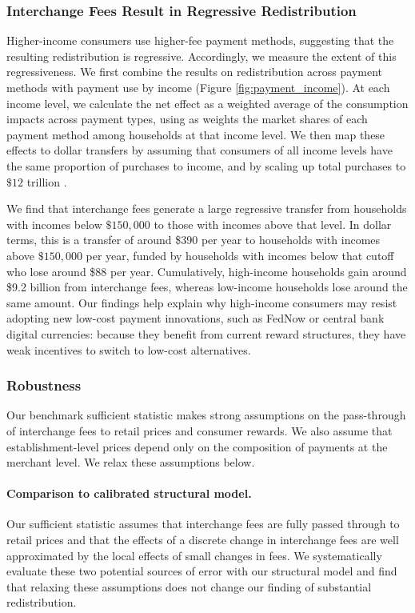 \documentclass[11pt,english]{article}
\theoremstyle{remark}
\begin{document}
\subsubsection{Interchange Fees Result in Regressive Redistribution}

Higher-income consumers use higher-fee payment methods, suggesting that the resulting redistribution is regressive.
Accordingly, we measure the extent of this regressiveness.
We first combine the results on redistribution across payment methods with payment use by income (Figure \ref{fig:payment_income}).
At each income level, we calculate the net effect as a weighted average of the consumption impacts across payment types, using as weights the market shares of each payment method among households at that income level.
We then map these effects to dollar transfers by assuming that consumers of all income levels have the same proportion of purchases to income, and by scaling up total purchases to $\$12$ trillion \citep{Nilson2023a}.

We find that interchange fees generate a large regressive transfer from households with incomes below $\$150,000$ to those with incomes above that level.
In dollar terms, this is a transfer of around \$390 per year to households with incomes above $\$150,000$ per year, funded by households with incomes below that cutoff who lose around \$88 per year.
Cumulatively, high-income households gain around \$9.2 billion from interchange fees, whereas low-income households lose around the same amount.
Our findings help explain why high-income consumers may resist adopting new low-cost payment innovations, such as FedNow or central bank digital currencies: because they benefit from current reward structures, they have weak incentives to switch to low-cost alternatives.

\subsubsection{Robustness}
\label{subsubsec:robustness}

Our benchmark sufficient statistic makes strong assumptions on the pass-through of interchange fees to retail prices and consumer rewards. We also assume that establishment-level prices depend only on the composition of payments at the merchant level. We relax these assumptions below.

\paragraph{Comparison to calibrated structural model.}
Our sufficient statistic assumes that interchange fees are fully passed through to retail prices and that the effects of a discrete change in interchange fees are well approximated by the local effects of small changes in fees.
We systematically evaluate these two potential sources of error with our structural model and find that relaxing these assumptions does not change our finding of substantial redistribution.
\end{document}
